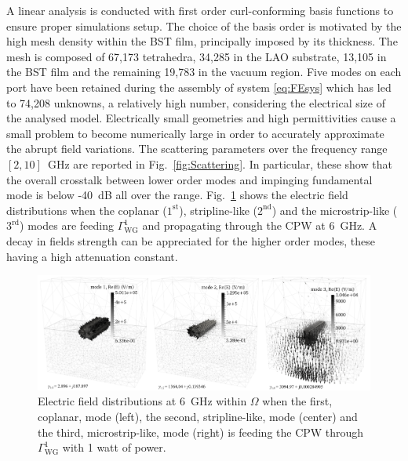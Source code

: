 \documentclass[journal,twoside,letterpaper]{IEEEtran}
\begin{document}
A linear analysis is conducted with first order curl-conforming basis functions to ensure proper simulations setup. The choice of the basis order is motivated by the high mesh density within the BST film, principally imposed by its thickness. The mesh is composed of 67,173 tetrahedra, 34,285 in the LAO substrate, 13,105 in the BST film and the remaining 19,783 in the vacuum region. Five modes on each port have been retained during the assembly of system \eqref{eq:FEsys} which has led to 74,208 unknowns, a relatively high number, considering the electrical size of the analysed model. Electrically small geometries and high permittivities cause a small problem to become numerically large in order to accurately approximate the abrupt field variations. The scattering parameters  over the frequency range $[2,10]$~GHz are reported in Fig.~\ref{fig:Scattering}. In particular, these show that the overall crosstalk between lower order modes and impinging fundamental mode is below -40~dB all over the range. Fig.~\ref{fig:fields} shows the electric field distributions when the coplanar ($1^\text{st}$), stripline-like ($2^\text{nd}$) and the microstrip-like ($3^\text{rd}$)  modes are feeding $\Gamma^1_\text{WG}$ and propagating through the CPW at 6~GHz. A decay in fields strength can be appreciated for the higher order modes, these having a high attenuation constant.
%
\begin{figure}[t!]
\centering
\includegraphics[width=\textwidth]{fields}
\caption{Electric field distributions at 6~GHz within $\Omega$ when the first, coplanar, mode (left), the second, stripline-like, mode (center) and the third, microstrip-like, mode (right) is feeding the CPW through $\Gamma^1_\text{WG}$ with 1 watt of power. }
\label{fig:fields}
\end{figure}
\end{document}
